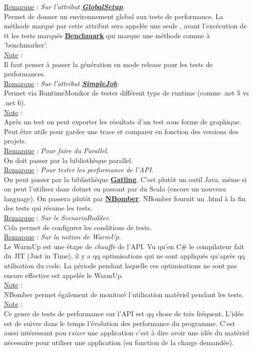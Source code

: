\documentclass[a4paper,12pt,twoside]{article}
\newcommand{\urlcolor}{magenta}  %
\newcommand{\keycolor}{purple} %
\newcommand{\rem}[2]{\noindent\underline{Remarque} : \textit{#1}.\\ \indent #2}
\newcommand{\note}[1]{\noindent\underline{Note} : \\ \indent #1}
\newcommand{\keyref}[2]{\hypersetup{urlcolor=\keycolor} \href{#1}{\textbf{#2}}\hypersetup{urlcolor=\urlcolor}}
\begin{document}
\rem{Sur l'attribut \keyref{https://benchmarkdotnet.org/articles/features/setup-and-cleanup.html}{GlobalSetup}}{Permet de donner un environnement global aux tests de performance. La méthode marqué par cette attribut sera appelée une seule , avant l'excécution de tt les tests marqués \keyref{https://benchmarkdotnet.org/articles/features/baselines.html}{Benchmark} qui marque une méthode comme à 'benchmarker'.}\\

\note{Il faut penser à passer la génération en mode release pour les tests de performances.}\\

\rem{Sur l'attribut \keyref{https://benchmarkdotnet.org/articles/configs/jobs.html}{SimpleJob}}{Permet via RuntimeMonikor de tester différent type de runtime (comme .net 5 vs .net 6).}\\

\note{Après un test on peut exporter les résultats d'un test sous forme de graphique. Peut être utile pour garder une trace et comparer en fonction des versions des projets.}\\

\rem{Pour faire du Parallel}{On doit passer par la bibliothèque parallel.}\\

\rem{Pour tester les performance de l'API}{On peut passer par la bibliothèque \keyref{https://gatling.io/}{Gatling}. C'est plutôt un outil Java, même si on peut l'utiliser dans dotnet en passant par du Scala (encore un nouveau language). On passera plutôt par \keyref{https://nbomber.com/}{NBomber}. NBomber fournit un .html à la fin des tests qui résume les tests.}\\

\rem{Sur le ScenarioBuilder}{Cela permet de configurer les conditions de tests.}\\

\rem{Sur la notion de WarmUp}{Le WarmUp est une étape de \textit{chauffe} de l'API. Vu qu'en C\# le compilateur fait du JIT (Just in Time), il y a qq optimisations qui ne sont appliqués qu'après qq utilisation du code. La période pendant laquelle ces optimisations ne sont pas encore effective est appelée le WarmUp.}\\

\note{NBomber permet également de monitoré l'utilisation matériel pendant les tests.}\\

\note{Ce genre de tests de performance sur l'API est qq chose de très fréquent. L'idée est de suivre dans le temps l'évolution des performance du programme. C'est aussi intéressant pou r\textit{sizer} une application c'est à dire avoir une idée du matériel nécessaire pour utiliser une application (en fonction de la charge demandée).}\\
\end{document}
